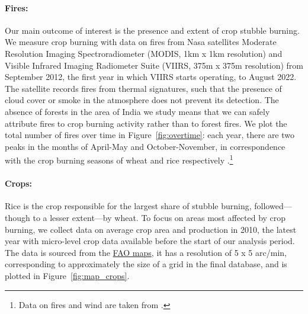 \documentclass[12pt]{article}
\begin{document}
\paragraph{Fires:} Our main outcome of interest is the presence and extent of crop stubble burning. We measure crop burning with data on fires from Nasa satellites Moderate Resolution Imaging Spectroradiometer (MODIS, 1km x 1km resolution) and Visible Infrared Imaging Radiometer Suite (VIIRS, 375m x 375m resolution) from September 2012, the first year in which VIIRS starts operating, to August 2022. The satellite records fires from thermal signatures, such that the presence of cloud cover or smoke in the atmosphere does not prevent its detection. The absence of forests in the area of India we study means that we can safely attribute fires to crop burning activity rather than to forest fires. We plot the total number of fires over time in Figure~\ref{fig:overtime}: each year, there are two peaks in the months of April-May and October-November, in correspondence with the crop burning seasons of wheat and rice respectively \citep{singh2014crop}.\footnote{Data on fires and wind are taken from \citet{dipoppa2024bureaucrat}.}

\paragraph{Crops:} Rice is the crop responsible for the largest share of stubble burning, followed—though to a lesser extent—by wheat. To focus on areas most affected by crop burning, we collect data on average crop area and production in 2010, the latest year with micro-level crop data available before the start of our analysis period. The data is sourced from the \href{https://mapspam.info/index.php/methodology/}{FAO maps}, it has a resolution of 5 x 5 arc/min, corresponding to approximately the size of a grid in the final database, and is plotted in Figure~\ref{fig:map_crops}.
\end{document}
